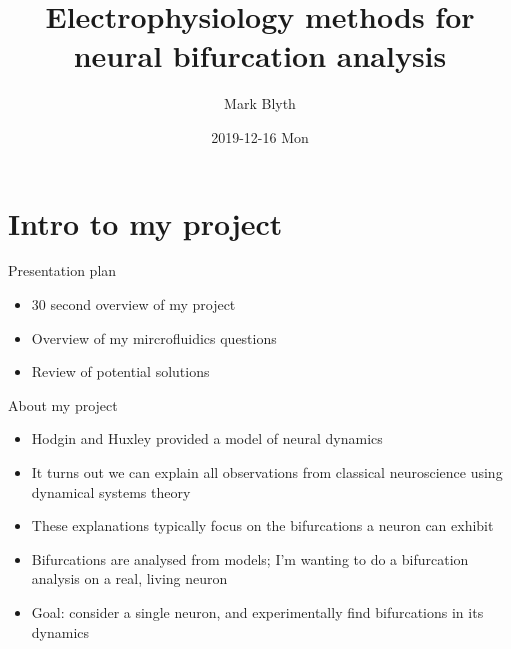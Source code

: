 \documentclass[aspectratio=169]{beamer}
\author{Mark Blyth}
\date{2019-12-16 Mon}
\title{Electrophysiology methods for neural bifurcation analysis}
\begin{document}
\maketitle

\section{Intro to my project}
\label{sec:org4e2005f}
\begin{frame}[label={sec:org6dac2e5}]{Presentation plan}
\begin{itemize}
\item \alert{30 second overview of my project}
\item Overview of my mircrofluidics questions
\item Review of potential solutions
\end{itemize}
\end{frame}
\begin{frame}[label={sec:org734db4a}]{About my project}
\begin{itemize}
\item Hodgin and Huxley provided a model of neural dynamics
\item It turns out we can explain all observations from classical neuroscience using dynamical systems theory
\item These explanations typically focus on the bifurcations a neuron can exhibit
\item Bifurcations are analysed from models; I'm wanting to do a bifurcation analysis on a real, living neuron
\item Goal: consider a single neuron, and experimentally find  bifurcations in its dynamics
\end{itemize}

\end{frame}
\end{document}
